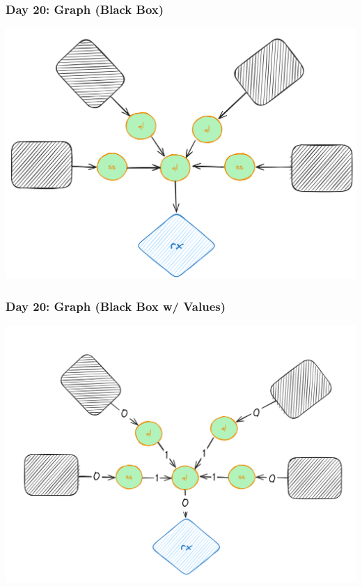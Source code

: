\begin{frame}
\frametitle{Day 20: Graph (Black Box)}

\includegraphics[width=\textwidth]{Day20BlackBox}

\end{frame}

\begin{frame}
\frametitle{Day 20: Graph (Black Box w/ Values)}

\includegraphics[width=\textwidth]{Day20BlackBoxValues}

\end{frame}

